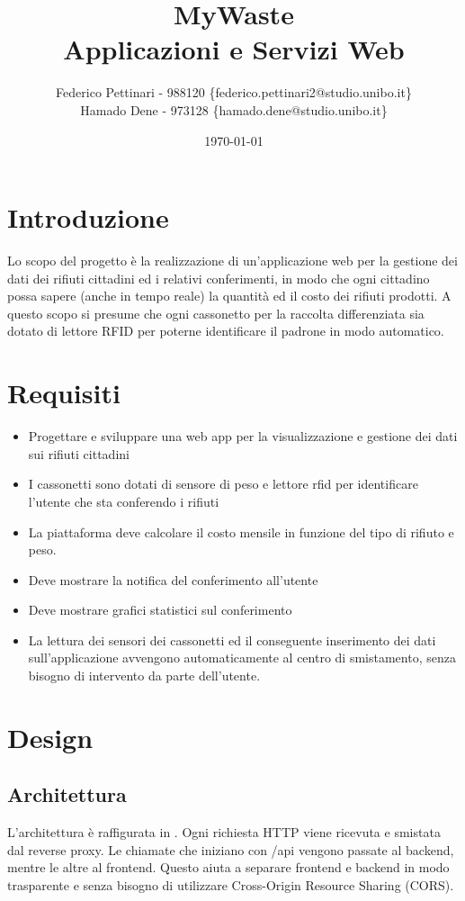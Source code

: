 \documentclass{report}
\title{
    MyWaste \\
    \large Applicazioni e Servizi Web
}
\author{Federico Pettinari - 988120 \{federico.pettinari2@studio.unibo.it\}\\
Hamado Dene - 973128 \{hamado.dene@studio.unibo.it\}}
\date{\today}
\begin{document}
\maketitle
\section{Introduzione}
Lo scopo del progetto è la realizzazione di un'applicazione web per la gestione dei dati dei rifiuti cittadini ed i relativi conferimenti,
in modo che ogni cittadino possa sapere (anche in tempo reale) la quantità ed il costo dei rifiuti prodotti.
A questo scopo si presume che ogni cassonetto per la raccolta differenziata sia dotato di lettore RFID per poterne identificare
il padrone in modo automatico.

\section{Requisiti}
\begin{itemize}
    \item Progettare e sviluppare una web app per la visualizzazione e gestione dei dati sui rifiuti cittadini
    \item I cassonetti sono dotati di sensore di peso e lettore rfid per identificare l’utente che sta conferendo i rifiuti
    \item La piattaforma deve calcolare il costo mensile in funzione del tipo di rifiuto e peso.
    \item Deve mostrare la notifica del conferimento all’utente
    \item Deve mostrare grafici statistici sul conferimento
    \item La lettura dei sensori dei cassonetti ed il conseguente inserimento dei dati sull'applicazione
    avvengono automaticamente al centro di smistamento, senza bisogno di intervento da parte dell'utente.
\end{itemize}

\section{Design}
\subsection{Architettura}
L'architettura è raffigurata in .
Ogni richiesta HTTP viene ricevuta e smistata dal reverse proxy.
Le chiamate che iniziano con /api vengono passate al backend, mentre le altre al frontend.
Questo aiuta a separare frontend e backend in modo trasparente e senza bisogno di utilizzare Cross-Origin Resource Sharing (CORS).
\end{document}
